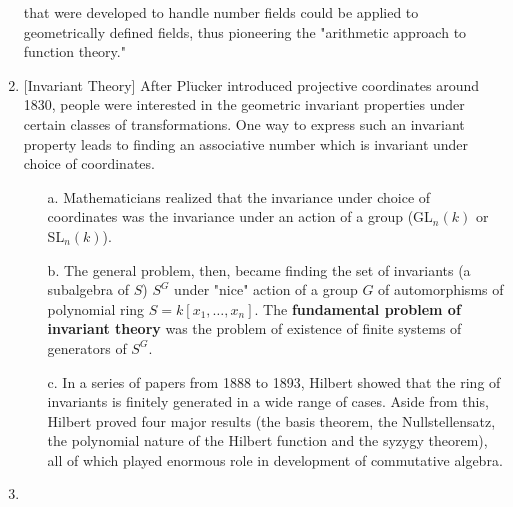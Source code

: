 \begin{enumerate}
            that were developed to handle number fields could be applied to geometrically defined fields, thus
            pioneering the "arithmetic approach to function theory."
      \item
            $[$Invariant Theory]
                  After Pl$\ddot{\text{u}}$cker introduced projective coordinates around 1830, people were
            interested in the geometric invariant properties under certain classes of transformations. One way to
            express such an invariant property leads to finding an associative number which is invariant under
            choice of coordinates.
            \begin{enumerate}
                  \item[a.]
                        Mathematicians realized that the invariance under choice of coordinates was the invariance
                        under an action of a group (GL$_n(k)$ or SL$_n(k)$).
                  \item[b.]
                        The general problem, then, became finding the set of invariants (a subalgebra of $S$) $S^G$ under
                        "nice" action of a group $G$ of automorphisms of polynomial ring $S=k[x_1,\ldots,x_n]$.
                        The \textbf{fundamental problem of invariant theory} was the problem of existence of
                        finite systems of generators of $S^G$.
                  \item[c.]
                        In a series of papers from 1888 to 1893, Hilbert showed that the ring of invariants is finitely
                        generated in a wide range of cases. Aside from this, Hilbert proved four major results (the basis
                        theorem, the Nullstellensatz, the polynomial nature of the Hilbert function and the syzygy theorem),
                        all of which played enormous role in development of commutative algebra.
            \end{enumerate}
      \item
            
\end{enumerate}